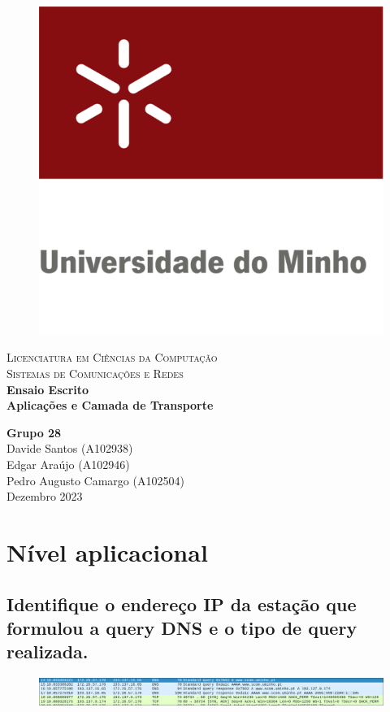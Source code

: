 \documentclass{article}
\begin{document}
\begin{titlepage}

\center %

\newcommand{\HRule}{\rule{\linewidth}{0.4mm}} %

\begin{figure}[h!]
    \centering
    \includegraphics[width=0.24\linewidth]{images/uniMinho.jpg}
\end{figure}

\textsc{\Large Licenciatura em Ciências da Computação}\\[0.4cm] %
\textsc{\Large Sistemas de Comunicações e Redes}\\[5cm]

{\Large\bfseries Ensaio Escrito}\\[0.5cm]
{\LARGE \bfseries Aplicações e Camada de Transporte} %


\vspace{5cm} %
{\bfseries Grupo 28} \\ \vspace{3mm}
Davide Santos (A102938) \\ \vspace{3mm}
Edgar Araújo (A102946) \\ \vspace{3mm}
Pedro Augusto Camargo (A102504) \\ \vspace{3mm}
\vspace{0.2cm}
{Dezembro 2023}\\[0.2cm] %

\vfill %
\end{titlepage}

\tableofcontents
\pagebreak

\section{Nível aplicacional}
\subsection{Identifique o endereço IP da estação que formulou a query DNS e o tipo de query realizada.}
\begin{figure}[h!]
    \centering
    \includegraphics[width=1\linewidth]{images/dns.png}
\end{figure}
\end{document}

